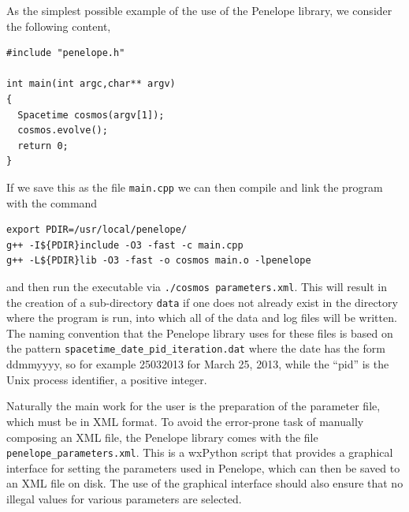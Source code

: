 \documentclass[12pt,letterpaper]{report}
\begin{document}
As the simplest possible example of the use of the Penelope library, we consider the 
following content,
\begin{verbatim}
#include "penelope.h"

int main(int argc,char** argv)
{
  Spacetime cosmos(argv[1]);
  cosmos.evolve();
  return 0;
}
\end{verbatim}
If we save this as the file \texttt{main.cpp} we can then compile and link the program 
with the command
\begin{verbatim}
export PDIR=/usr/local/penelope/
g++ -I${PDIR}include -O3 -fast -c main.cpp 
g++ -L${PDIR}lib -O3 -fast -o cosmos main.o -lpenelope
\end{verbatim}
and then run the executable via \texttt{./cosmos parameters.xml}. This will result in the 
creation of a sub-directory \texttt{data} if one does not already exist in the directory where 
the program is run, into which all of the data and log files will be written. The naming 
convention that the Penelope library uses for these files is based on the pattern 
\texttt{spacetime\_date\_pid\_iteration.dat} where the date has the form ddmmyyyy, so 
for example 25032013 for March 25, 2013, while the ``pid'' is the Unix process identifier, a 
positive integer. 

Naturally the main work for the user is the preparation of the parameter file, which must 
be in XML format. To avoid the error-prone task of manually composing an XML file, the Penelope 
library comes with the file \texttt{penelope\_parameters.xml}. This is a wxPython script that 
provides a graphical interface for setting the parameters used in Penelope, which can then be 
saved to an XML file on disk. The use of the graphical interface should also ensure that no 
illegal values for various parameters are selected. 
\end{document}
